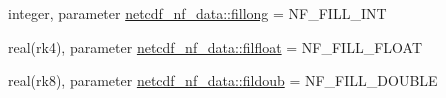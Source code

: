 \begin{DoxyCompactItemize}
\item 
integer, parameter \hyperlink{namespacenetcdf__nf__data_adaf0ece658812a591dca054cf56fa372}{netcdf\+\_\+nf\+\_\+data\+::fillong} = N\+F\+\_\+\+F\+I\+L\+L\+\_\+\+I\+NT
\item 
real(rk4), parameter \hyperlink{namespacenetcdf__nf__data_a48e1b09e7c4e80fed6bb3d442432ca59}{netcdf\+\_\+nf\+\_\+data\+::filfloat} = N\+F\+\_\+\+F\+I\+L\+L\+\_\+\+F\+L\+O\+AT
\item 
real(rk8), parameter \hyperlink{namespacenetcdf__nf__data_a177e262787afc3c17e1a0a695e58ecba}{netcdf\+\_\+nf\+\_\+data\+::fildoub} = N\+F\+\_\+\+F\+I\+L\+L\+\_\+\+D\+O\+U\+B\+LE
\end{DoxyCompactItemize}
